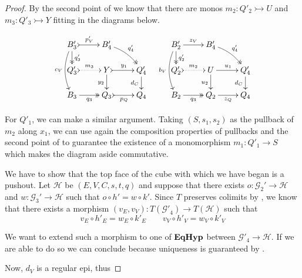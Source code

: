 \documentclass[a4paper,UKenglish,cleveref,pdftex,thm-restate,numberwithinsect]{lipics-v2021}
\def\B{\textbf {\textup{B}}}
\newcommand{\catname}[1]{\textbf{\textup{#1}}}
\newcommand{\EqHyp}{\catname{EqHyp}} %
\newcommand{\mto}{\rightarrowtail}
\begin{document}
\begin{proof}
	By the second point of  we know that there are monos $m_2\colon Q'_2\mto U$ and $m_3\colon Q'_3\mto Y$  fitting in the diagrams below.
	
	\[\xymatrix@R=15pt{B'_3 \ar@{>>}[d]^{q'_3} \ar@/_.3cm/[dd]_{c_V} \ar@{>->}[r]^{p'_V}& B'_4 \ar@/^.2cm/@{>>}[dr]^{q'_4} & & B'_2 \ar[r]^{z_V} \ar@{>>}[d]^{q'_2} \ar@/_.3cm/[dd]_{b_V}& B'_4 \ar@/^.2cm/@{>>}[dr]^{q'_4}\\ Q'_3 \ar@{>.>}[r]^{m_3}& Y  \ar@{>->}[r]^{y_1} \ar[d]_{y_2}& Q'_4 \ar[d]_{d_C}& Q'_2 \ar@{>.>}[r]^{m_2} & U \ar[d]_{u_2} \ar[r]^{u_1} & Q'_4 \ar[d]_{d_C} \\ B_3 \ar@{>>}[r]_{q_3} & Q_3 \ar@{>->}[r]_{p_Q} & Q_4 &B_2 \ar@{>>}[r]_{q_3} & Q_2 \ar[r]_{z_Q} & Q_4}\]

	\noindent 
	\parbox{8.5cm}{
	For $Q'_1$, we can make a similar argument. Taking $(S, s_1, s_2)$ as the pullback of $m_2$ along $x_1$, we can use again the composition properties of pullbacks and the second point of  to guarantee the existence of a monomorphism $m_1\colon Q'_1\to S$ which makes the diagram aside commutative.}\hfill
	\parbox{4cm}{}

We have to show that the top face of the cube with which we have began is a pushout. Let $\mathcal{H}$ be $(E, V, C, s, t, q)$ and suppose that there exists  $o\colon  \mathcal{G}_2' \to \mathcal{H}$ and $w\colon  \mathcal{G}_3' \to \mathcal{H}$ such that $o \circ h' = w \circ k'$. Since $T$ preserves colimits by , we know that there exists a morphism $(v_E, v_V)\colon T(\mathcal{G'}_4)\to T(\mathcal{H})$ such that	
\[v_E\circ h'_E=w_E\circ k'_E\qquad v_V\circ h'_V=w_V\circ k'_V\]

We want to extend such a morphism to one of $\EqHyp$ between $\mathcal{G}'_4\to \mathcal{H}$. If we are able to do so we can conclude because uniqueness is guaranteed by . 



Now, $d_V$ is a regular epi, thus 









\end{proof}
\end{document}
